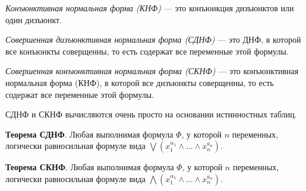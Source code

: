 \dftion \textit{Конъюнктивная нормальная форма (КНФ)} --- это конъюнкция дизъюнктов или один дизъюнкт.

\dftion \textit{Совершенная дизъюнктивная нормальная форма (СДНФ)} --- это ДНФ, в которой все конъюнкты соверщенны, то есть содержат все переменные этой формулы.

\dftion \textit{Совершенная конъюнктивная нормальная форма (СКНФ)} --- это конъюнктивная нормальная форма (КНФ), в которой все дизъюнкты соверщенны, то есть содержат все переменные этой формулы.

СДНФ и СКНФ вычисляются очень просто на основании истинностных таблиц.

\textbf{Теорема СДНФ}. Любая выполнимая формула $\Phi$, у которой $n$ переменных, логически равносильная формуле вида $\bigvee(x_1^{\alpha_1} \land \dots \land x_n^{a_n})$.

\textbf{Теорема СКНФ}. Любая выполнимая формула $\Phi$, у которой $n$ переменных, логически равносильная формуле вида $\bigwedge(x_1^{\alpha_1} \land \dots \land x_n^{a_n})$.